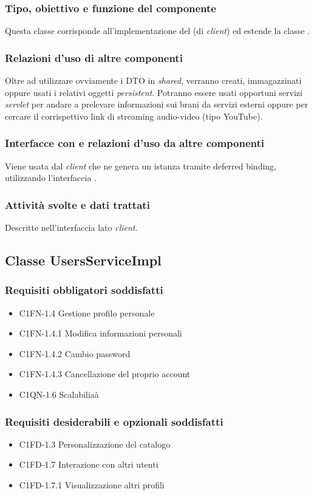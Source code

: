 \subsubsection*{Tipo, obiettivo e funzione del componente}
Questa classe corrisponde all'implementazione del  (di
\emph{client}) ed estende la classe .
\subsubsection*{Relazioni d'uso di altre componenti}
Oltre ad utilizzare ovviamente i DTO in \emph{shared}, verranno creati,
immagazzinati oppure usati i relativi oggetti \emph{persistent}.
Potranno essere usati opportuni servizi \emph{servlet} per andare a prelevare
informazioni sui brani da servizi esterni oppure per cercare il corrispettivo
link di streaming audio-video (tipo YouTube).
\subsubsection*{Interfacce con e relazioni d'uso da altre componenti}
Viene usata dal \emph{client} che ne genera un istanza tramite deferred binding,
utilizzando l'interfaccia .
\subsubsection*{Attivit\`a svolte e dati trattati}
Descritte nell'interfaccia lato \emph{client}.


\subsection{Classe UsersServiceImpl}
\subsubsection*{Requisiti obbligatori soddisfatti}
\begin{itemize}
    \item C1FN-1.4 Gestione profilo personale
    \item C1FN-1.4.1 Modifica informazioni personali
    \item C1FN-1.4.2 Cambio password
    \item C1FN-1.4.3 Cancellazione del proprio account
    \item C1QN-1.6 Scalabilia\`a
\end{itemize}
\subsubsection*{Requisiti desiderabili e opzionali soddisfatti}
\begin{itemize}
    \item C1FD-1.3 Personalizzazione del catalogo
    \item C1FD-1.7 Interazione con altri utenti
    \item C1FD-1.7.1 Visualizzazione altri profili
\end{itemize}
